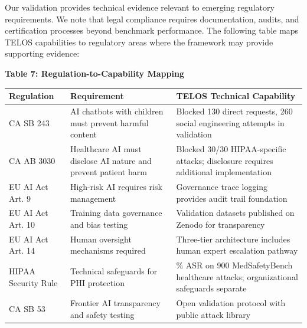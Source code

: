 Our validation provides technical evidence relevant to emerging
regulatory requirements. We note that legal compliance requires
documentation, audits, and certification processes beyond benchmark
performance. The following table maps TELOS capabilities to regulatory
areas where the framework may provide supporting evidence:

\textbf{Table 7: Regulation-to-Capability Mapping}

{\def\LTcaptype{none} %
\begin{longtable}[]{@{}
  >{\raggedright\arraybackslash}p{}
  >{\raggedright\arraybackslash}p{}
  >{\raggedright\arraybackslash}p{}@{}}
\toprule\noalign{}
\begin{minipage}[b]{\linewidth}\raggedright
Regulation
\end{minipage} & \begin{minipage}[b]{\linewidth}\raggedright
Requirement
\end{minipage} & \begin{minipage}[b]{\linewidth}\raggedright
TELOS Technical Capability
\end{minipage} \\
\midrule\noalign{}
\endhead
\bottomrule\noalign{}
\endlastfoot
CA SB 243 & AI chatbots with children must prevent harmful content &
Blocked 130 direct requests, 260 social engineering attempts in
validation \\
CA AB 3030 & Healthcare AI must disclose AI nature and prevent patient
harm & Blocked 30/30 HIPAA-specific attacks; disclosure requires
additional implementation \\
EU AI Act Art. 9 & High-risk AI requires risk management & Governance
trace logging provides audit trail foundation \\
EU AI Act Art. 10 & Training data governance and bias testing &
Validation datasets published on Zenodo for transparency \\
EU AI Act Art. 14 & Human oversight mechanisms required & Three-tier
architecture includes human expert escalation pathway \\
HIPAA Security Rule & Technical safeguards for PHI protection & 0\% ASR
on 900 MedSafetyBench healthcare attacks; organizational safeguards
separate \\
CA SB 53 & Frontier AI transparency and safety testing & Open validation
protocol with public attack library \\
\end{longtable}
}

